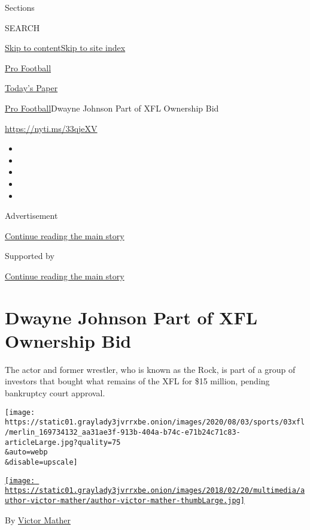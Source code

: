 Sections

SEARCH

\protect\hyperlink{site-content}{Skip to
content}\protect\hyperlink{site-index}{Skip to site index}

\href{https://www.nytimes3xbfgragh.onion/section/sports/football}{Pro
Football}

\href{https://myaccount.nytimes3xbfgragh.onion/auth/login?response_type=cookie\&client_id=vi}{}

\href{https://www.nytimes3xbfgragh.onion/section/todayspaper}{Today's
Paper}

\href{/section/sports/football}{Pro Football}\textbar{}Dwayne Johnson
Part of XFL Ownership Bid

\url{https://nyti.ms/33qjeXV}

\begin{itemize}
\item
\item
\item
\item
\item
\end{itemize}

Advertisement

\protect\hyperlink{after-top}{Continue reading the main story}

Supported by

\protect\hyperlink{after-sponsor}{Continue reading the main story}

\hypertarget{dwayne-johnson-part-of-xfl-ownership-bid}{%
\section{Dwayne Johnson Part of XFL Ownership
Bid}\label{dwayne-johnson-part-of-xfl-ownership-bid}}

The actor and former wrestler, who is known as the Rock, is part of a
group of investors that bought what remains of the XFL for \$15 million,
pending bankruptcy court approval.

\texttt{[image: https://static01.graylady3jvrrxbe.onion/images/2020/08/03/sports/03xfl/merlin\_169734132\_aa31ae3f-913b-404a-b74c-e71b24c71c83-articleLarge.jpg?quality=75\\\&auto=webp\\\&disable=upscale]}

\href{https://www.nytimes3xbfgragh.onion/by/victor-mather}{\texttt{[image: https://static01.graylady3jvrrxbe.onion/images/2018/02/20/multimedia/author-victor-mather/author-victor-mather-thumbLarge.jpg]}}

By \href{https://www.nytimes3xbfgragh.onion/by/victor-mather}{Victor
Mather}


